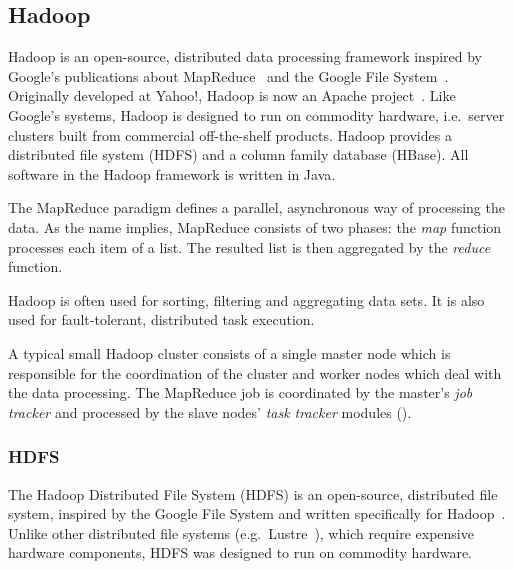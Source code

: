 
 
\subsection{Hadoop}

Hadoop is an open-source, distributed data processing framework inspired by Google's publications about MapReduce~\cite{Dean:2008:MSD:1327452.1327492} and the Google File System~\cite{Ghemawat:2003:GFS:945445.945450}. Originally developed at Yahoo!, Hadoop is now an Apache project~\cite{Hadoop}. Like Google's systems, Hadoop is designed to run on commodity hardware, i.e.\ server clusters built from commercial off-the-shelf products. Hadoop provides a distributed file system (HDFS) and a column family database (HBase). All software in the Hadoop framework is written in Java.

The MapReduce paradigm defines a parallel, asynchronous way of processing the data. As the name implies, MapReduce consists of two phases: the \emph{map} function processes each item of a list. The resulted list is then aggregated by the \emph{reduce} function.

Hadoop is often used for sorting, filtering and aggregating data sets. It is also used for fault-tolerant, distributed task execution.

A typical small Hadoop cluster consists of a single master node which is responsible for the coordination of the cluster and worker nodes which deal with the data processing. The MapReduce job is coordinated by the master's \emph{job tracker} and processed by the slave nodes' \emph{task tracker} modules ().


\subsubsection{HDFS}

The Hadoop Distributed File System (HDFS) is an open-source, distributed file system, inspired by the Google File System and written specifically for Hadoop~\cite{Hadoop}. Unlike other distributed file systems (e.g.\ Lustre~\cite{Lustre}), which require expensive hardware components, HDFS was designed to run on commodity hardware.

